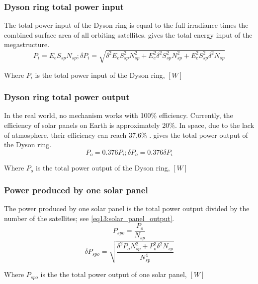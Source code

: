 \documentclass[stu, 11pt, a4paper, floatsintext, noextraspace]{apa7}
\begin{document}
	\subsubsection{Dyson ring total power input}
	The total power input of the Dyson ring is equal to the full irradiance times the combined surface area of all orbiting satellites.  gives the total energy input of the megastructure.
	\begin{equation}
		\label{eq11:dyson_ring_input}
		P_i=E_eS_{sp}N_{sp}; \delta P_i=\sqrt{\delta^2E_eS_{sp}^2N_{sp}^2+E_e^2\delta^2S_{sp}^2N_{sp}^2+E_e^2S_{sp}^2\delta^2N_{sp}}
	\end{equation}
	\begin{center}
		Where $P_{i}$ is the total power input of the Dyson ring, $[W]$
	\end{center}
	\subsubsection{Dyson ring total power output}
	In the real world, no mechanism works with 100\% efficiency. Currently, the efficiency of solar panels on Earth is approximately 20\%. In space, due to the lack of atmosphere, their efficiency can reach 37,6\% \Parencite{kotamraju_modeling_2019}.  gives the total power output of the Dyson ring.
	\begin{equation}
		\label{eq12:dyson_ring_output}
		P_o=0.376P_i; \delta P_o=0.376\delta P_i
	\end{equation}
	\begin{center}
		Where $P_{o}$ is the total power output of the Dyson ring, $[W]$
	\end{center}
	\subsubsection{Power produced by one solar panel}
	The power produced by one solar panel is the total power output divided by the number of the satellites; see \cref{eq13:solar_panel_output}.
	\begin{equation}
		\label{eq13:solar_panel_output}
		P_{spo}=\frac{P_o}{N_{sp}}
	\end{equation}
	\begin{equation*}
		\delta P_{spo}=\sqrt{\frac{\delta^2P_oN_{sp}^2+P_o^2\delta^2N_{sp}}{N_{sp}^4}}
	\end{equation*}
	\begin{center}
		Where $P_{spo}$ is the the total power output of one solar panel, $[W]$
	\end{center}
\end{document}
